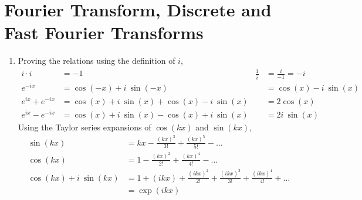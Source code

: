 \section{Fourier Transform, Discrete and Fast Fourier Transforms}

\begin{enumerate}
    \item Proving the relations using the definition of $ i $,
          \begin{align}
              i \cdot i        & = -1                                          &
              \frac{1}{i}      & = \frac{i}{-1} = -i                             \\
              e^{-ix}          & = \cos(-x) + i\ \sin(-x)                      &
                               & = \cos(x) - i\ \sin(x)                          \\
              e^{ix} + e^{-ix} & = \cos(x) + i\ \sin(x) + \cos(x) - i\ \sin(x) &
                               & = 2\cos(x)                                      \\
              e^{ix} - e^{-ix} & = \cos(x) + i\ \sin(x) - \cos(x) + i\ \sin(x) &
                               & = 2i\ \sin(x)
          \end{align}
          Using the Taylor series expansions of $ \cos(kx) $ and $ \sin(kx) $,
          \begin{align}
              \sin(kx)               & = kx - \frac{(kx)^3}{3!} + \frac{(kx)^5}{5!}
              - \dots                                                               \\
              \cos(kx)               & = 1 - \frac{(kx)^2}{2!} + \frac{(kx)^4}{4!}
              - \dots                                                               \\
              \cos(kx) + i\ \sin(kx) & = 1 + (ikx) + \frac{(ikx)^2}{2!}
              + \frac{(ikx)^3}{3!} + \frac{(ikx)^4}{4!} + \dots                     \\
                                     & = \exp(ikx)
          \end{align}


\end{enumerate}
